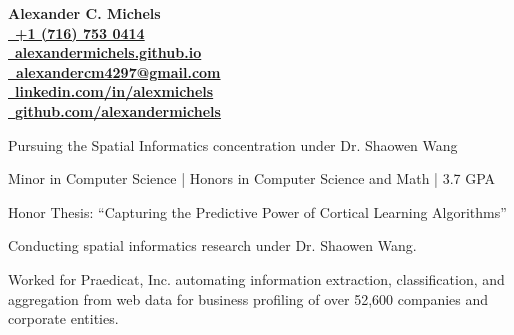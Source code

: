 \documentclass{acmresume}
\begin{document}
	
	\begin{multicols}{2}
		\vspace*{.1cm}
		\textbf{\Huge Alexander C. Michels}\\ \columnbreak
		\hfill\href{tel:17167530414}{\faPhone~\textbf{+1 (716) 753 0414}} \\
		\hfill\href{http://alexandermichels.github.io}{\faGlobeAmericas~\textbf{alexandermichels.github.io}} \\
		\hfill\href{mailto:alexandercm4297@gmail.com}{\textbf{\faEnvelope~alexandercm4297@gmail.com}} \\ \hfill\href{https://www.linkedin.com/in/alexmichels/}{\faLinkedin~\textbf{linkedin.com/in/alexmichels}} \\
		 \hfill\href{https://github.com/alexandermichels}{\faGithub \ \textbf{github.com/alexandermichels}}
	\end{multicols}
	
	
		\begin{titemize}
			\item{Pursuing the Spatial Informatics concentration under Dr. Shaowen Wang}
		\end{titemize}

		\begin{titemize}
            \item{Minor in Computer Science | Honors in Computer Science and Math | 3.7 GPA}
            \item Honor Thesis: ``Capturing the Predictive Power of Cortical Learning Algorithms''
        \end{titemize}
	
	
        \begin{titemize}
            \item Conducting spatial informatics research under Dr. Shaowen Wang.
        \end{titemize}
		
        \begin{titemize}
            \item{Worked for Praedicat, Inc. automating information extraction, classification, and aggregation from web data for business profiling of over 52,600 companies and corporate entities.}
        \end{titemize}
\end{document}
